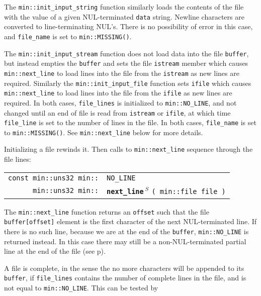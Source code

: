 \documentclass[12pt]{article}
\makeatletter
\newcommand{\ttindex}[1]{\index{#1@{\tt #1}}}
\newcommand{\minindex}[1]{\ttindex{min::#1}\ttindex{#1}}
\newcommand{\pagref}[1]{p\pageref{#1}}
\newcommand{\EOL}{\penalty \exhyphenpenalty}
\newenvironment{indpar}[1][0.3in]%
	{\begin{list}{}%
		     {\setlength{\itemsep}{0in}%
		      \setlength{\topsep}{0in}%
		      \setlength{\parsep}{1ex}%
		      \setlength{\labelwidth}{#1}%
		      \setlength{\leftmargin}{#1}%
		      \addtolength{\leftmargin}{\labelsep}}%
	 \item}%
	{\end{list}}
\newcommand{\LABEL}[1]{\label{#1}}
\newcommand{\MINKEY}[1]{{\tt \bf #1}\minindex{#1}}
\newcommand{\MINNBKEY}[1]{{\tt #1}\minindex{#1}}
\newcommand{\RESIZE}{$\,^S$}
\makeatother
\begin{document}
The {\tt min::init\_input\_string} function similarly loads the contents
of the file with the value of a given NUL-terminated {\tt data} string.
Newline characters are converted to line-terminating NUL's.
There is no possibility of error in this case, and
{\tt file\_\EOL name} is set to {\tt min::\EOL MISSING()}.

The {\tt min::init\_input\_stream} function does not load data into
the file {\tt buffer}, but instead empties the {\tt buffer}
and sets the file {\tt istream} member
which causes {\tt min::\EOL next\_\EOL line} to load lines into the
file from the {\tt istream} as new lines are required.  Similarly
the {\tt min::\EOL init\_\EOL input\_\EOL file} function sets
{\tt ifile} which causes {\tt min::\EOL next\_\EOL line} to load lines
into the file from the {\tt ifile} as new lines are required.
In both cases, {\tt file\_lines} is initialized
to {\tt min::\EOL NO\_\EOL LINE}, and not changed until
an end of file is read from {\tt istream} or {\tt ifile}, at which time
{\tt file\_\EOL line} is set to the number of lines in the file.
In both cases, {\tt file\_\EOL name} is set to {\tt min::\EOL MISSING()}.
See {\tt min::\EOL next\_\EOL line} below for more details.

Initializing a file rewinds it.  Then calls to
{\tt min::\EOL next\_\EOL line} sequence through the file
lines:

\begin{indpar}[1em]\begin{tabular}{r@{}l}
\verb|const min::uns32 min::| & \MINNBKEY{NO\_LINE}
\LABEL{MIN::NO_LINE} \\
\verb|min::uns32 min::|
    & \MINKEY{next\_line\RESIZE} \verb|( min::file file )|
\LABEL{MIN::NEXT_LINE_OF_FILE} \\
\end{tabular}\end{indpar}

The {\tt min::\EOL next\_\EOL line} function returns an
{\tt offset} such that the file {\tt buffer[offset]} element
is the first character of the next NUL-terminated line.
If there is no such line, because we are at the end of the {\tt buffer},
{\tt min::\EOL NO\_\EOL LINE} is returned instead.  In this case
there may still be a non-NUL-terminated partial line at the end
of the file (see \pagref{PARTIAL-LINE}).

A file is complete, in the sense the no more characters will be
appended to its {\tt buffer}, if {\tt file\_\EOL lines} contains
the number of complete lines in the file, and is not equal to
{\tt min::\EOL NO\_\EOL LINE}.  This can be tested by
\end{document}
